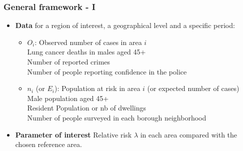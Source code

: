 \documentclass[slidestop,compress,serif,10pt]{beamer}
\begin{document}
\begin{frame}
    \frametitle{General framework - I}
\begin{itemize}
\item \textbf{Data} for a region of interest, a geographical level and a specific period:
        \begin{itemize}
            \vfill\item $O_i$: Observed number of cases in area $i$\\
				Lung cancer deaths in males aged 45+\\
				Number of reported crimes \\
				Number of people reporting confidence in the police\\
            \pause\vfill\item $n_i$ (or $E_i$): Population at risk in area $i$ (or expected number of cases)\\
            Male population aged 45+\\
            Resident Population or nb of dwellings\\
            Number of people surveyed in each borough neighborhood\\                
        \end{itemize}
\pause\vfill\item \textbf{Parameter of interest} Relative risk $\lambda$ in each area compared with the chosen reference area.
\end{itemize}
\end{frame}
\end{document}
